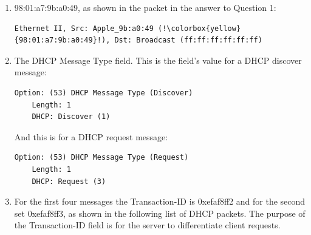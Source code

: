 \documentclass{article}
\begin{document}
\begin{enumerate}

    \item 98:01:a7:9b:a0:49, as shown in the packet in the answer to Question 1:
\begin{verbatim}
Ethernet II, Src: Apple_9b:a0:49 (!\colorbox{yellow}{98:01:a7:9b:a0:49}!), Dst: Broadcast (ff:ff:ff:ff:ff:ff)
\end{verbatim}

    \item The DHCP Message Type field. This is the field's value for a DHCP discover message:
\begin{verbatim}
Option: (53) DHCP Message Type (Discover)
    Length: 1
    DHCP: Discover (1)
\end{verbatim}
    And this is for a DHCP request message:
\begin{verbatim}
Option: (53) DHCP Message Type (Request)
    Length: 1
    DHCP: Request (3)
\end{verbatim}

    \item For the first four messages the Transaction-ID is 0xefaf8ff2 and for the second set 0xefaf8ff3, as shown in the following list of DHCP packets. The purpose of the Transaction-ID field is for the server to differentiate client requests.
    

\end{enumerate}
\end{document}
